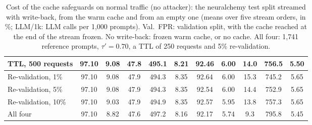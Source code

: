 \documentclass[runningheads]{llncs}
\newif\ifrev
\newcommand{\rev}[1]{\ifrev\hl{#1}\else#1\fi}                  %
\begin{document}
\begin{table}[t]
{\begin{tabular}{@{}lccccc|ccccc@{}}
\rev{TTL, 500 requests} & \rev{97.10} & \rev{9.08} & \rev{47.8} & \rev{495.1} & \rev{8.21} & \rev{92.46} & \rev{6.00} & \rev{14.0} & \rev{756.5} & \rev{5.50} \\
\midrule
\rev{Re-validation, 1\%} & \rev{97.10} & \rev{9.08} & \rev{47.9} & \rev{494.3} & \rev{8.35} & \rev{92.64} & \rev{6.00} & \rev{15.3} & \rev{745.2} & \rev{5.65} \\
\rev{Re-validation, 5\%} & \rev{97.10} & \rev{9.08} & \rev{47.9} & \rev{494.3} & \rev{8.35} & \rev{92.54} & \rev{6.00} & \rev{14.4} & \rev{752.9} & \rev{5.65} \\
\rev{Re-validation, 10\%} & \rev{97.10} & \rev{9.03} & \rev{47.9} & \rev{494.9} & \rev{8.35} & \rev{92.57} & \rev{5.95} & \rev{13.8} & \rev{757.3} & \rev{5.65} \\
\midrule
\rev{All four} & \rev{97.10} & \rev{8.82} & \rev{47.6} & \rev{497.2} & \rev{8.16} & \rev{92.17} & \rev{5.74} & \rev{9.3} & \rev{795.8} & \rev{5.45} \\
\bottomrule
\end{tabular}%
}
\caption{\protect\rev{Cost of the cache safeguards on normal traffic (no attacker): the neuralchemy test split streamed with write-back, from the warm cache and from an empty one (means over five stream orders, in \%; LLM/1k: LLM calls per 1{,}000 prompts). Val.~FPR: validation split, with the cache reached at the end of the stream frozen. No write-back: frozen warm cache, or no cache. All four: 1{,}741 reference prompts, $\tau'=0.70$, a TTL of 250 requests and 5\% re-validation.}}
\label{tab:safeguards}
\vspace{-7mm}
\end{table}
\end{document}
